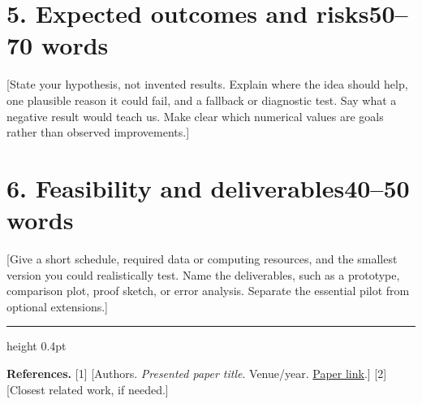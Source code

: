 \documentclass[11pt,letterpaper]{article}
\newcommand{\wordbudget}[1]{{\normalfont\small\color{SecondaryText}\hfill #1 words}}
\newcommand{\referencesheading}{%
  \par\vspace{4pt}
  {\color{ProposalBlue}\hrule height 0.4pt}
  \vspace{3pt}
}
\begin{document}
\section*{5. Expected outcomes and risks\wordbudget{50--70}}
[State your hypothesis, not invented results. Explain where the idea should help,
one plausible reason it could fail, and a fallback or diagnostic test. Say what a
negative result would teach us. Make clear which numerical values are goals rather
than observed improvements.]

\section*{6. Feasibility and deliverables\wordbudget{40--50}}
[Give a short schedule, required data or computing resources, and the smallest
version you could realistically test. Name the deliverables, such as a prototype,
comparison plot, proof sketch, or error analysis. Separate the essential pilot from
optional extensions.]

\vfill
\referencesheading
{\small\textbf{References.} [1] [Authors. \textit{Presented paper title}. Venue/year.
\href{https://example.com}{Paper link}.] [2] [Closest related work, if needed.]\par}
\end{document}
